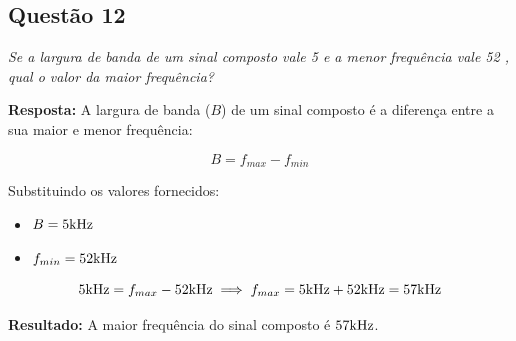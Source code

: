 \subsection*{Questão 12}

\textit{Se a largura de banda de um sinal composto vale 5 \khz e a menor frequência vale 52 \khz, qual o valor da maior frequência?}

\textbf{Resposta:}
A largura de banda ($B$) de um sinal composto é a diferença entre a sua maior e menor frequência:

\begin{equation}
    B = f_{max} - f_{min}
\end{equation}

Substituindo os valores fornecidos:
\begin{itemize}
    \item $B = 5 \text{kHz}$
    \item $f_{min} = 52 \text{kHz}$
\end{itemize}

\begin{equation}
    5 \text{kHz} = f_{max} - 52 \text{kHz}
    \implies f_{max} = 5 \text{kHz} + 52 \text{kHz} = 57 \text{kHz}
\end{equation}

\textbf{Resultado:}
A maior frequência do sinal composto é $57 \text{kHz}$.